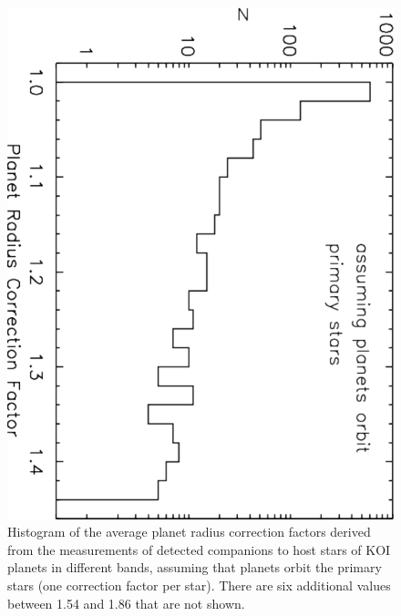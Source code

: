 \documentclass[twocolumn,appendixfloats]{aastex6}
\begin{document}
\begin{figure}[!]
\centering
\includegraphics[angle=90,scale=0.4]{KOI_Prad_correction_factors_primary_histo.pdf}
\caption{Histogram of the average planet radius correction factors derived
from the measurements of detected companions to host stars of KOI
planets in different bands, assuming that planets orbit the primary stars
(one correction factor per star). There are six additional values between 
1.54 and 1.86 that are not shown.
\label{KOI_Prad_correction1}}
\end{figure}
\end{document}
